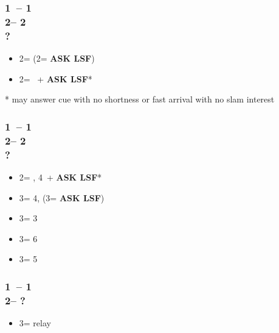 \documentclass[12pt, a4paper]{report}
\renewcommand{\lsf}{{\color{BrickRed}\textbf{ASK LSF}}}
\begin{document}
\begin{bidpage}
\subsubsection*{1\clubs\ -- 1\major\\
                2\diams -- 2\hearts\\
                ?}
\begin{itemize}
    \item 2\spades = \unbal (2\nt = \lsf)
    \item 2\nt = \bal\ + \lsf*
\end{itemize}

* may answer cue with no shortness or fast arrival with no slam interest
\end{bidpage}

\begin{bidpage}
\subsubsection*{1\clubs\ -- 1\major\\
                2\diams -- 2\spades\\
                ?}
\begin{itemize}
    \item 2\nt = \bal, 4\hearts\ + \lsf*
    \item 3\clubs = 4\hearts, \unbal (3\diams = \lsf)
    \item 3\diams = 3\hearts
    \item 3\hearts = 6\hearts
    \item 3\spades = 5\hearts
\end{itemize}
\end{bidpage}

\begin{bidpage}
\subsubsection*{1\clubs\ -- 1\hearts\\
                2\nt -- ?}
\begin{itemize}
    \item 3\clubs = relay
\end{itemize}
\end{bidpage}
\end{document}
